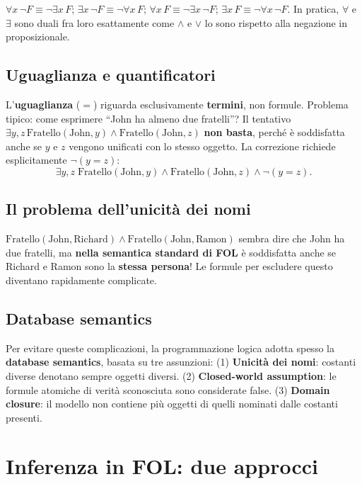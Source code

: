 \documentclass[11pt,a4paper]{report}
\begin{document}
$\forall x\,\neg F \equiv \neg\exists x\, F$; $\exists x\,\neg F \equiv \neg\forall x\, F$; $\forall x\, F \equiv \neg\exists x\,\neg F$; $\exists x\, F \equiv \neg\forall x\,\neg F$. In pratica, $\forall$ e $\exists$ sono duali fra loro esattamente come $\wedge$ e $\vee$ lo sono rispetto alla negazione in proposizionale.

\subsection*{Uguaglianza e quantificatori}

L'\textbf{uguaglianza} ($=$) riguarda esclusivamente \textbf{termini}, non formule. Problema tipico: come esprimere ``John ha almeno due fratelli''? Il tentativo $\exists y,z\, \text{Fratello}(\text{John},y)\wedge\text{Fratello}(\text{John},z)$ \textbf{non basta}, perché è soddisfatta anche se $y$ e $z$ vengono unificati con lo stesso oggetto. La correzione richiede esplicitamente $\neg(y=z)$:
\[
\exists y,z\; \text{Fratello}(\text{John},y)\wedge\text{Fratello}(\text{John},z)\wedge\neg(y=z).
\]

\subsection*{Il problema dell'unicità dei nomi}

$\text{Fratello}(\text{John},\text{Richard})\wedge\text{Fratello}(\text{John},\text{Ramon})$ sembra dire che John ha due fratelli, ma \textbf{nella semantica standard di FOL} è soddisfatta anche se Richard e Ramon sono la \textbf{stessa persona}! Le formule per escludere questo diventano rapidamente complicate.

\subsection*{Database semantics}

Per evitare queste complicazioni, la programmazione logica adotta spesso la \textbf{database semantics}, basata su tre assunzioni: (1) \textbf{Unicità dei nomi}: costanti diverse denotano sempre oggetti diversi. (2) \textbf{Closed-world assumption}: le formule atomiche di verità sconosciuta sono considerate false. (3) \textbf{Domain closure}: il modello non contiene più oggetti di quelli nominati dalle costanti presenti.

\section{Inferenza in FOL: due approcci}
\end{document}
